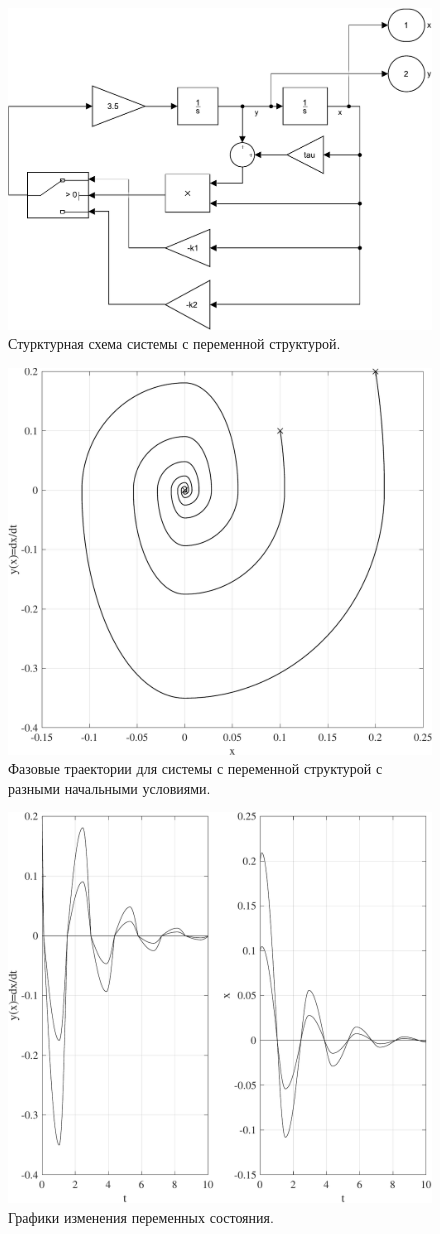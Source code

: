 \begin{figure}[!h]\centering
\includegraphics[width=0.7\linewidth]{images/sim_variable_structure1}
\caption{ Стурктурная схема системы с переменной структурой.}\label{fig:sim_variable_structure1}
\end{figure}
\begin{figure}[!h]\centering
\includegraphics[width=0.7\linewidth]{images/variable_structure1}
\caption{ Фазовые траектории для системы с переменной структурой с разными начальными условиями.}\label{fig:variable_structure1}
\end{figure}
\begin{figure}[!h]\centering
\includegraphics[width=0.7\linewidth]{images/variable_structure1_sys}
\caption{ Графики изменения переменных состояния.}\label{fig:variable_structure1_sys}
\end{figure}
